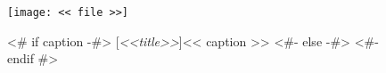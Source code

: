 {%
    \thispagestyle{empty}%
    \begin{landscape}%
      \begin{figure}
        \hspace{-10pt}\begin{minipage}[t]{7.5in}
          \texttt{[image: << file >>]}
        \end{minipage}\hfill
        \hspace{5pt}
        \begin{minipage}[b]{1.5in}
          <# if caption -#>
          [\textit{<<title>>}]{<< caption >>}
          <#- else -#>
          <#- endif #>\label{fig:<< id >>}
        \end{minipage}
      \end{figure}
    \end{landscape}
    \clearpage%
}
